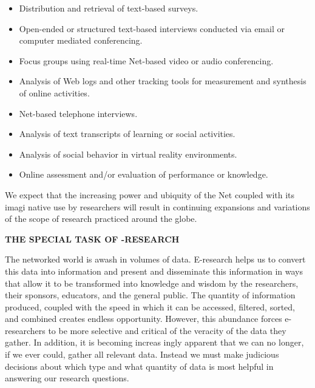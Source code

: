 \documentclass[a4, 11pt]{article}
\begin{document}
\begin{itemize}
	\item
	Distribution and retrieval of text-based surveys.
	\item
	Open-ended or structured text-based interviews conducted via email or computer mediated conferencing.
	\item
	 Focus groups using real-time Net-based video or audio conferencing.
	 \item
	  Analysis of Web logs and other tracking tools for measurement and synthesis of
	online activities.
	\item
	Net-based telephone interviews.
	\item
	Analysis of text transcripts of learning or social activities.
	\item
	Analysis of social behavior in virtual reality environments.
	\item
	 Online assessment and/or evaluation of performance or knowledge.

\end{itemize}

We expect that the increasing power and ubiquity of the Net coupled with its imagi native use by researchers will result in continuing expansions and variations of the scope of research practiced around the globe.

	\vspace{0.5cm}
{\large \textbf{THE SPECIAL TASK OF -RESEARCH}}
	\vspace{0.5cm}
	
The networked world is awash in volumes of data. E-research helps us to convert this data into information and present and disseminate this information in ways that allow it to be transformed into knowledge and wisdom by the researchers, their sponsors, educators, and the general public. The quantity of information produced, coupled with the speed in which it can be accessed, filtered, sorted, and combined creates endless opportunity. However, this abundance forces e-researchers to be more selective and critical of the veracity of the data they gather. In addition, it is becoming increas ingly apparent that we can no longer, if we ever could, gather all relevant data. Instead we must make judicious decisions about which type and what quantity of data is most helpful in answering our research questions.
\end{document}
